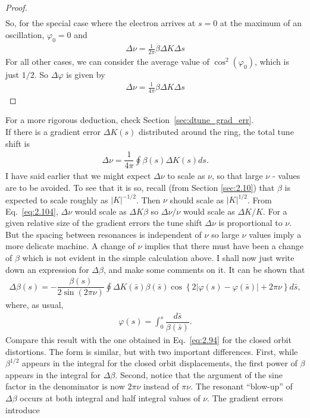 \begin{proof}
\begin{align*}
	\end{align*}
    So, for the special case where the electron arrives at $s=0$ at the maximum of an oscillation, $\varphi_0=0$ and
    \begin{align*}
		\Delta \nu = \frac{1}{2\pi}\beta \Delta K \Delta s
	\end{align*}
    For all other cases, we can consider the average value of $\cos^2(\varphi_0)$, which is just $1/2$. So $\Delta \varphi$ is given by
	\begin{align*}
		\Delta \nu = \frac{1}{4\pi}\beta \Delta K \Delta s
	\end{align*}
\end{proof}
For a more rigorous deduction, check Section~\ref{sec:dtune_grad_err}.\\
If there is a gradient error $\Delta K(s)$ distributed around the ring, the total tune shift is
\begin{align}\label{eq:2.104}
	\Delta\nu = \dfrac{1}{4\pi}\oint \beta(s) \Delta K(s) ds.
\end{align}
I have said earlier that we might expect $\Delta\nu$ to scale as $\nu$, so that large $\nu$ -
values are to be avoided. To see that it is so, recall (from Section \ref{sec:2.10}) that $\beta$ is expected to scale roughly as $|K|^{-1/2}$. Then $\nu$ should scale as $|K|^{1/2}$. From Eq.~\eqref{eq:2.104}, $\Delta\nu$ would scale as $\Delta K\beta$ so $\Delta\nu/\nu$ would scale as $\Delta K/K$. For a given relative size of the gradient errors the tune shift $\Delta\nu$ is proportional to $\nu$. But the spacing between resonances is independent of $\nu$ so large $\nu$ values imply a more delicate machine.
A change of $\nu$ implies that there must have been a change of $\beta$ which is not evident in the simple calculation above. I shall now just write down an expression for $\Delta\beta$, and make some comments on it. It can be shown that
\begin{align}\label{eq:2.105}
	\boxed{\Delta\beta(s) = -\dfrac{\beta(s)}{2\sin{(2\pi\nu)}}\oint \Delta K(\bar{s})\beta(\bar{s})\cos{\left\lbrace 2 |\varphi(s) - \varphi(\bar{s})| + 2\pi\nu \right\rbrace} d\bar{s}},
\end{align}
where, as usual,
\begin{align*}
	\varphi(s) = \int_0^s\dfrac{d\bar{s}}{\beta(\bar{s})}.
\end{align*}
Compare this result with the one obtained in Eq.~\eqref{eq:2.94} for the closed orbit distortions. The form is similar, but with two important differences.  First, while $\beta^{1/2}$ appears in the integral for the closed orbit displacements, the first power of $\beta$ appears in the integral for $\Delta\beta$. Second, notice that the argument of the sine factor in the denominator is now $2\pi\nu$ instead of $\pi\nu$. The resonant “blow-up” of $\Delta\beta$ occurs at both integral and half integral values of $\nu$. The gradient errors introduce
